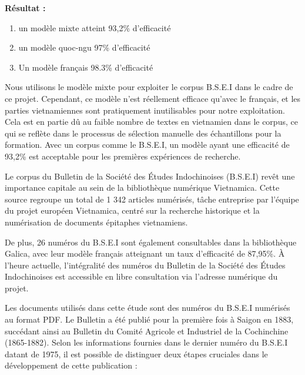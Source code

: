 \textbf{Résultat :} 

\begin{enumerate}
    \item un modèle mixte atteint 93,2\% d'efficacité
    \item un modèle quoc-ngu 97\% d'efficacité
    \item Un modèle français 98.3\% d'efficacité
\end{enumerate}

Nous utilisons le modèle mixte pour exploiter le corpus B.S.E.I dans le cadre de ce projet. Cependant, ce modèle n'est réellement efficace qu'avec le français, et les parties vietnamiennes sont pratiquement inutilisables pour notre exploitation. Cela est en partie dû au faible nombre de textes en vietnamien dans le corpus, ce qui se reflète dans le processus de sélection manuelle des échantillons pour la formation. Avec un corpus comme le B.S.E.I, un modèle ayant une efficacité de 93,2\% est acceptable pour les premières expériences de recherche.

Le corpus du Bulletin de la Société des Études Indochinoises (B.S.E.I) revêt une importance capitale au sein de la bibliothèque numérique Vietnamica. Cette source regroupe un total de 1 342 articles numérisés, tâche entreprise par l'équipe du projet européen Vietnamica, centré sur la recherche historique et la numérisation de documents épitaphes vietnamiens.

De plus, 26 numéros du B.S.E.I sont également consultables dans la bibliothèque Galica, avec leur modèle français atteignant un taux d'efficacité de 87,95\%. À l'heure actuelle, l'intégralité des numéros du Bulletin de la Société des Études Indochinoises est accessible en libre consultation via l'adresse numérique du projet.

Les documents utilisés dans cette étude sont des numéros du B.S.E.I numérisés au format PDF. Le Bulletin a été publié pour la première fois à Saigon en 1883, succédant ainsi au Bulletin du Comité Agricole et Industriel de la Cochinchine (1865-1882). Selon les informations fournies dans le dernier numéro du B.S.E.I datant de 1975, il est possible de distinguer deux étapes cruciales dans le développement de cette publication :

